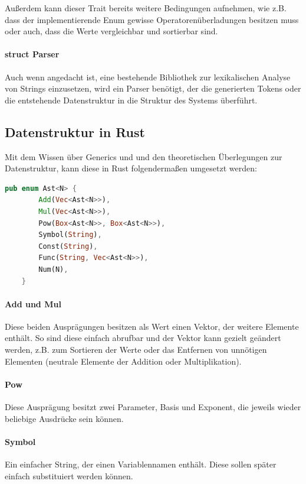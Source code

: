 \documentclass[11pt,a4paper, ngerman]{article}
\begin{document}
Außerdem kann dieser Trait bereits weitere Bedingungen aufnehmen, wie z.B. dass der implementierende Enum gewisse Operatorenüberladungen besitzen muss oder auch, dass die Werte vergleichbar und sortierbar sind.

\paragraph{struct Parser} Auch wenn angedacht ist, eine bestehende Bibliothek zur lexikalischen Analyse von Strings einzusetzen, wird ein Parser benötigt, der die generierten Tokens oder die entstehende Datenstruktur in die Struktur des Systems überführt.

\subsection{Datenstruktur in Rust}
Mit dem Wissen über Generics und und den theoretischen Überlegungen zur Datenstruktur, kann diese in Rust folgendermaßen umgesetzt werden:
\begin{lstlisting}[language=rust, caption={Datenstruktur in Rust}]
    pub enum Ast<N> {
        Add(Vec<Ast<N>>),
        Mul(Vec<Ast<N>>),
        Pow(Box<Ast<N>>, Box<Ast<N>>),
        Symbol(String),
        Const(String),
        Func(String, Vec<Ast<N>>),
        Num(N),
    }
\end{lstlisting}

\paragraph{Add und Mul} Diese beiden Ausprägungen besitzen als Wert einen Vektor, der weitere Elemente enthält. So sind diese einfach abrufbar und der Vektor kann gezielt geändert werden, z.B. zum Sortieren der Werte oder das Entfernen von unnötigen Elementen (neutrale Elemente der Addition oder Multiplikation).

\paragraph{Pow} Diese Ausprägung besitzt zwei Parameter, Basis und Exponent, die jeweils wieder beliebige Ausdrücke sein können.

\paragraph{Symbol} Ein einfacher String, der einen Variablennamen enthält. Diese sollen später einfach substituiert werden können.
\end{document}

